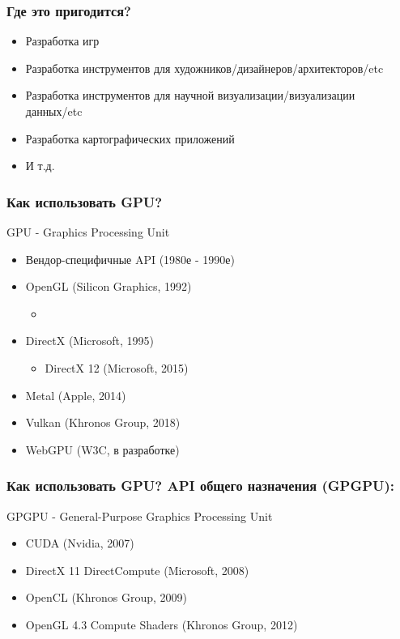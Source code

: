 \documentclass{beamer}
\begin{document}
\begin{frame}
\frametitle{Где это пригодится?}
\begin{itemize}
\pause
\item Разработка игр
\pause
\item Разработка инструментов для художников/дизайнеров/архитекторов/etc
\pause
\item Разработка инструментов для научной визуализации/визуализации данных/etc
\pause
\item Разработка картографических приложений
\pause
\item И т.д.
\end{itemize}
\end{frame}

\begin{frame}
\frametitle{Как использовать GPU? }
GPU - Graphics Processing Unit
\pause
\pause
\begin{itemize}
\item Вендор-специфичные API (1980е - 1990е)
\pause
\item OpenGL (Silicon Graphics, 1992)
\pause
\begin{itemize}
\item {}
\end{itemize}
\pause
\item DirectX (Microsoft, 1995)
\pause
\begin{itemize}
\item {DirectX 12 (Microsoft, 2015)}
\end{itemize}
\pause
\item {\only<11->{\color{red}}Metal (Apple, 2014)}
\pause
\item {Vulkan (Khronos Group, 2018)}
\pause
\item {WebGPU (W3C, в разработке)}
\end{itemize}
\end{frame}

\begin{frame}
\frametitle{Как использовать GPU? API общего назначения (GPGPU):}
GPGPU - General-Purpose Graphics Processing Unit
\pause
\begin{itemize}
\item CUDA (Nvidia, 2007)
\pause
\item DirectX 11 DirectCompute (Microsoft, 2008)
\pause
\item OpenCL (Khronos Group, 2009)
\pause
\item OpenGL 4.3 Compute Shaders (Khronos Group, 2012)
\end{itemize}
\end{frame}
\end{document}
